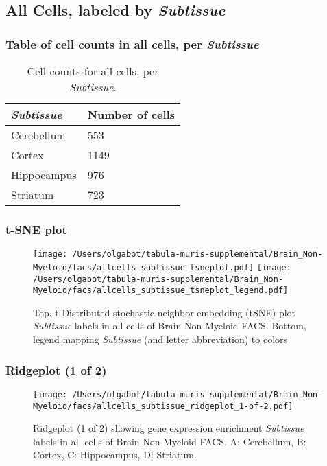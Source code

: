 \clearpage

\subsection{All Cells, labeled by \emph{Subtissue}}
\subsubsection{Table of cell counts in all cells, per \emph{Subtissue}}\begin{table}[h]
\centering
\label{my-label}
\begin{tabular}{@{}ll@{}}
\toprule

\emph{Subtissue}& Number of cells \\ \midrule
Cerebellum & 553 \\

Cortex & 1149 \\

Hippocampus & 976 \\

Striatum & 723 \\
\bottomrule
\end{tabular}
\caption{Cell counts for all cells, per \emph{Subtissue}.}
\end{table}

\clearpage
\subsubsection{t-SNE plot}
\begin{figure}[h]
\centering
\texttt{[image: /Users/olgabot/tabula-muris-supplemental/Brain\_Non-Myeloid/facs/allcells\_subtissue\_tsneplot.pdf]}
\texttt{[image: /Users/olgabot/tabula-muris-supplemental/Brain\_Non-Myeloid/facs/allcells\_subtissue\_tsneplot\_legend.pdf]}
\caption{Top, t-Distributed stochastic neighbor embedding (tSNE) plot  \emph{Subtissue} labels in all cells of Brain Non-Myeloid FACS. Bottom, legend mapping \emph{Subtissue} (and letter abbreviation) to colors}
\end{figure}


\clearpage

\subsubsection{Ridgeplot (1 of 2)}
\begin{figure}[h]
\centering
\texttt{[image: /Users/olgabot/tabula-muris-supplemental/Brain\_Non-Myeloid/facs/allcells\_subtissue\_ridgeplot\_1-of-2.pdf]}

\caption{ Ridgeplot (1 of 2)  showing gene expression enrichment \emph{Subtissue} labels in all cells of Brain Non-Myeloid FACS. A: Cerebellum, B: Cortex, C: Hippocampus, D: Striatum.}
\end{figure}



